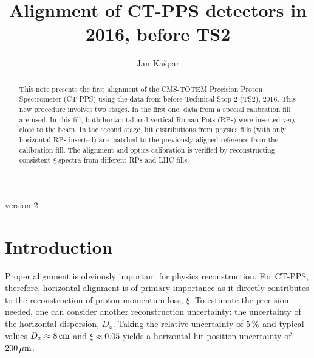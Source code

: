 \documentclass[TOTEM]{cern/cernphprep}
\def\un#1{\,{\rm #1}}
\begin{document}
\begin{titlepage}

\renewcommand{\EXPLOGO}{fig/logo_totem_black.pdf}



\title{Alignment of CT-PPS detectors in 2016, before TS2}


\author{Jan Ka\v spar}


\begin{abstract}
This note presents the first alignment of the CMS-TOTEM Precision Proton Spectrometer (CT-PPS) using the data from before Technical Stop 2 (TS2), 2016. This new procedure involves two stages. In the first one, data from a special calibration fill are used. In this fill, both horizontal and vertical Roman Pots (RPs) were inserted very close to the beam. In the second stage, hit distributions from physics fills (with only horizontal RPs inserted) are matched to the previously aligned reference from the calibration fill. The alignment and optics calibration is verified by reconstructing consistent $\xi$ spectra from different RPs and LHC fills.
\end{abstract}

\centerline{version 2}

\end{titlepage}


\linenumbers

\section{Introduction}
\label{s:intro}

Proper alignment is obviously important for physics reconstruction. For CT-PPS, therefore, horizontal alignment is of primary importance as it directly contributes to the reconstruction of proton momentum loss, $\xi$. To estimate the precision needed, one can consider another reconstruction uncertainty: the uncertainty of the horizontal dispersion, $D_x$. Taking the relative uncertainty of $5\un{\%}$ \cite{optics_calibration} and typical values $D_x \approx 8\un{cm}$ and $\xi \approx 0.05$ yields a horizontal hit position uncertainty of $200\un{\mu m}$.
\end{document}
